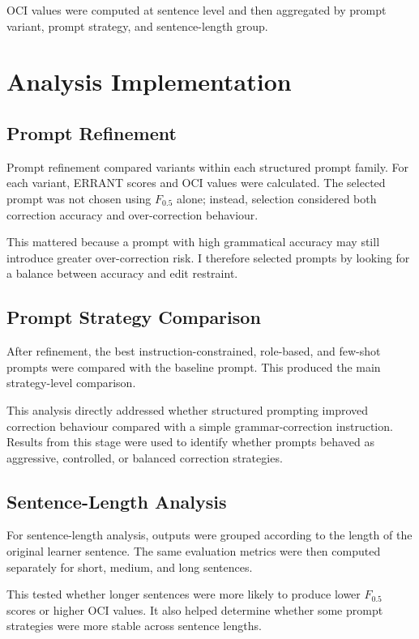 OCI values were computed at sentence level and then aggregated by prompt variant, prompt strategy, and sentence-length group.

\section{Analysis Implementation}

\subsection{Prompt Refinement}

Prompt refinement compared variants within each structured prompt family. For each variant, ERRANT scores and OCI values were calculated. The selected prompt was not chosen using $F_{0.5}$ alone; instead, selection considered both correction accuracy and over-correction behaviour.

This mattered because a prompt with high grammatical accuracy may still introduce greater over-correction risk. I therefore selected prompts by looking for a balance between accuracy and edit restraint.

\subsection{Prompt Strategy Comparison}

After refinement, the best instruction-constrained, role-based, and few-shot prompts were compared with the baseline prompt. This produced the main strategy-level comparison.

This analysis directly addressed whether structured prompting improved correction behaviour compared with a simple grammar-correction instruction. Results from this stage were used to identify whether prompts behaved as aggressive, controlled, or balanced correction strategies.

\subsection{Sentence-Length Analysis}

For sentence-length analysis, outputs were grouped according to the length of the original learner sentence. The same evaluation metrics were then computed separately for short, medium, and long sentences.

This tested whether longer sentences were more likely to produce lower $F_{0.5}$ scores or higher OCI values. It also helped determine whether some prompt strategies were more stable across sentence lengths.


